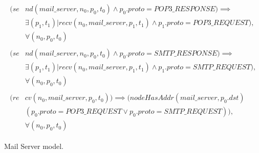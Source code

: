 \begin{figure}
	{\footnotesize
		\begin{subequations} 
		\begin{align}
				\begin{split}
					\label{mail-server_constr2}
					(se& nd(mail\_server , n_{0}, p_{0}, t_{0}) \wedge p_{0}.proto = POP3\_RESPONSE) \implies \\
					& \exists (p_{1}, t_{1}) | recv(n_{0}, mail\_server, p_{1}, t_{1})  \wedge p_{1}.proto = POP3\_REQUEST),\\
					& \forall (n_{0}, p_{0}, t_{0})
				\end{split} \\
				\begin{split}
					\label{mail-server_constr3}
					(se& nd(mail\_server , n_{0}, p_{0}, t_{0}) \wedge p_{0}.proto = SMTP\_RESPONSE) \implies \\
					& \exists (p_{1}, t_{1}) | recv(n_{0}, mail\_server, p_{1}, t_{1}) \wedge  p_{1}.proto = SMTP\_REQUEST),\\
					& \forall (n_{0}, p_{0}, t_{0})
				\end{split} \\
				\begin{split}
					\label{mail-server_constr4}
					(re& cv(n_{0}, mail\_server, p_{0}, t_{0})) \implies  (nodeHasAddr(mail\_server, p_{0}.dst) \\
					& (p_{0}.proto = POP3\_REQUEST \vee p_{0}.proto = SMTP\_REQUEST)), \\
					& \forall (n_{0}, p_{0}, t_{0})
				\end{split}
			\end{align}
		\end{subequations}
	}%
	\caption{Mail Server model.}
	\label{mail-server_model}
\end{figure}

